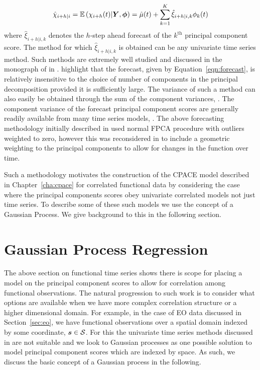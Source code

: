 \begin{equation}\label{eqn:forecast}
	\hat{\chi}_{i+h | i} = \operatorname{\mathbb{E}}\left(\chi_{i+h}(t) | \bm{{Y}}, \bm{{\phi}}\right) = \hat{\mu}(t) + \sum_{k=1}^K \hat{\xi}_{i+h | i, k} \phi_k(t) 
\end{equation}
where $\hat{\xi}_{i+h | i, k}$ denotes the $h$-step ahead forecast of the $k^\text{th}$ principal component score.
The method for which $\hat{\xi}_{i+h | i, k}$ is obtained can be any univariate time series method. Such methods are extremely well studied and discussed in the monograph of \citeauthor{hyndman_forecasting_2021} in \citep{hyndman_forecasting_2021}.
\citeauthor{hyndman_stochastic_2008} highlight that the forecast, given by Equation~\eqref{eqn:forecast}, is relatively insensitive to the choice of number of components in the principal decomposition provided it is sufficiently large.
The variance of such a method can also easily be obtained through the sum of the component variances, \citep{hyndman_stochastic_2008}.
The component variance of the forecast principal component scores are generally readily available from many time series models, \citep{hyndman_forecasting_2021}. 
The above forecasting methodology initially described in \citep{hyndman_robust_2007} used normal FPCA procedure with outliers weighted to zero, however this was reconsidered in \citep{hyndman_forecasting_2009} to include a geometric weighting to the principal components to allow for changes in the function over time. 

Such a methodology motivates the construction of the CPACE model described in Chapter~\ref{cha:cpace} for correlated functional data by considering the case where the principal components scores obey univariate correlated models not just time series. To describe some of these such models we use the concept of a Gaussian Process. We give background to this in the following section. 

\section{Gaussian Process Regression \label{sec:gp}}
The above section on functional time series shows there is scope for placing a model on the principal component scores to allow for correlation among functional observations.
The natural progression to such work is to consider what options are available when we have more complex correlation structure or a higher dimensional domain. 
For example, in the case of EO data discussed in Section~\ref{sec:eo}, we have functional observations over a spatial domain indexed by some coordinate, $\bm{{s}} \in \mathcal{S}$.
For this the univariate time series methods discussed in \citep{hyndman_forecasting_2009} are not suitable and we look to Gaussian processes as one possible solution to model principal component scores which are indexed by space.
As such, we discuss the basic concept of a Gaussian process in the following. 

